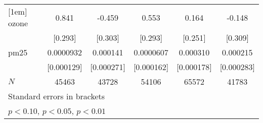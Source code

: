 \documentclass[11pt]{article}
\begin{document}
\begin{subappendices}
\begin{center}
{{\begin{tabular}{l*{5}{c}}
					[1em]
					ozone       &       0.841\sym{***}&      -0.459         &       0.553\sym{*}  &       0.164         &      -0.148         \\
					&     [0.293]         &     [0.303]         &     [0.293]         &     [0.251]         &     [0.309]         \\
					[1em]
					pm25        &   0.0000932         &    0.000141         &   0.0000607         &    0.000310\sym{*}  &    0.000215         \\
					&  [0.000129]         &  [0.000271]         &  [0.000162]         &  [0.000178]         &  [0.000283]         \\
					\hline
					\(N\)       &       45463         &       43728         &       54106         &       65572         &       41783         \\
					\hline\hline
					\multicolumn{6}{l}{\footnotesize Standard errors in brackets}\\
					\multicolumn{6}{l}{\footnotesize \sym{*} \(p<0.10\), \sym{**} \(p<0.05\), \sym{***} \(p<0.01\)}\\
				\end{tabular}
			}
			
			}
		\end{center}
		
		
		\begin{center}
			 \label{tab:title} 
			{
				
			}
		\end{center}
		
		
		\begin{center}
			 \label{tab:title} 
			{
				
			}
		\end{center}
		
		
		
		
		
		
	\end{subappendices}	
	
	
	
	
	\newpage
	{\footnotesize 
		
		\singlespacing
		
	}
	
	
\end{document}
